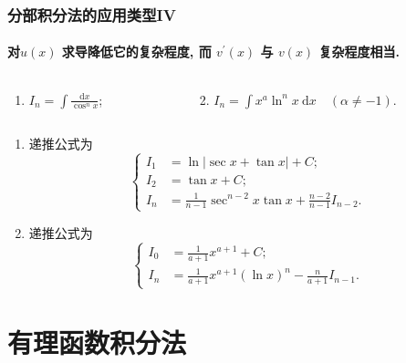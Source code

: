 \documentclass[
10pt,
aspectratio=43,
]{beamer}
\begin{document}
\begin{frame}
	\frametitle{分部积分法的应用类型IV}
	\framesubtitle{对$u(x)$ 求导降低它的复杂程度, 而 $v^{\prime}(x)$ 与 $v(x)$ 复杂程度相当. }
	\everymath{\displaystyle}
	\begin{block}{}
		\begin{columns}[onlytextwidth]
			\begin{column}{0.5\textwidth}
				\begin{enumerate}
					\item $I_n=\int \frac{\mathrm{d} x}{\cos ^n x}$;
				\end{enumerate}
			\end{column}
			\begin{column}{0.5\textwidth}
				\begin{enumerate}
					\setcounter{enumi}{1}
					\item $I_n=\int x^a \ln ^n x \mathrm{~d} x \quad(\alpha \neq-1)$.
				\end{enumerate}
			\end{column}
		\end{columns}
	\end{block}
	\begin{exampleblock}{}
		\begin{enumerate}
			\pause \item 递推公式为
			      $$
				      \left\{
				      \begin{aligned}
					      I_1 & =\ln\left|\sec x+\tan x\right|+C;                       \\
					      I_2 & =\tan x+C;                                              \\
					      I_n & =\frac{1}{n-1}\sec^{n-2}x\tan x+\frac{n-2}{n-1}I_{n-2}.
				      \end{aligned}
				      \right.
			      $$
			      \pause \item 递推公式为
			      $$
				      \left\{
				      \begin{aligned}
					      I_0 & =\frac{1}{a+1}x^{a+1}+C;                                        \\
					      I_n & =\frac{1}{a+1}x^{a+1}\left(\ln x\right)^n-\frac{n}{a+1}I_{n-1}.
				      \end{aligned}
				      \right.
			      $$
		\end{enumerate}
	\end{exampleblock}
\end{frame}

\section{有理函数积分法}
\end{document}
